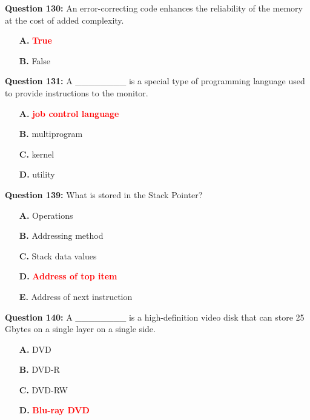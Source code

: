 \documentclass[12pt,a4paper]{article}
\begin{document}
\textbf{Question 130:} An error-correcting code enhances the reliability of the memory at the cost of added complexity.

\begin{itemize}
    \item[\textbf{A.}] \textcolor{red}{\textbf{True}}
    \item[\textbf{B.}] False
\end{itemize}

\vspace{0.5cm}

\textbf{Question 131:} A ________ is a special type of programming language used to provide instructions to the monitor.

\begin{itemize}
    \item[\textbf{A.}] \textcolor{red}{\textbf{job control language}}
    \item[\textbf{B.}] multiprogram
    \item[\textbf{C.}] kernel
    \item[\textbf{D.}] utility
\end{itemize}

\vspace{0.5cm}

\textbf{Question 139:} What is stored in the Stack Pointer?

\begin{itemize}
    \item[\textbf{A.}] Operations
    \item[\textbf{B.}] Addressing method
    \item[\textbf{C.}] Stack data values
    \item[\textbf{D.}] \textcolor{red}{\textbf{Address of top item}}
    \item[\textbf{E.}] Address of next instruction
\end{itemize}

\vspace{0.5cm}

\textbf{Question 140:} A ________ is a high-definition video disk that can store 25 Gbytes on a single layer on a single side.

\begin{itemize}
    \item[\textbf{A.}] DVD
    \item[\textbf{B.}] DVD-R
    \item[\textbf{C.}] DVD-RW
    \item[\textbf{D.}] \textcolor{red}{\textbf{Blu-ray DVD}}
\end{itemize}
\end{document}
